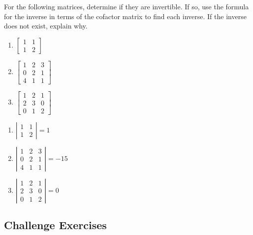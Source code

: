 \documentclass{ximera}
\begin{document}
\begin{problem}\label{prb:7.31} For the following matrices, determine if they are invertible. If so, use the formula for the inverse in terms of the cofactor matrix to
find each inverse. If the inverse does not exist, explain why.
\begin{enumerate}
\item
$\left[
\begin{array}{rr}
1 & 1 \\
1 & 2
\end{array}
\right]$
\item
$\left[
\begin{array}{rrr}
1 & 2 & 3 \\
0 & 2 & 1 \\
4 & 1 & 1
\end{array}
\right]$
\item
$\left[
\begin{array}{rrr}
1 & 2 & 1 \\
2 & 3 & 0 \\
0 & 1 & 2
\end{array}
\right] $
\end{enumerate}
\begin{hint}
\begin{enumerate}
\item $\left\vert
\begin{array}{cc}
1 & 1 \\
1 & 2
\end{array}
\right\vert = 1$
\item $\left\vert
\begin{array}{ccc}
1 & 2 & 3 \\
0 & 2 & 1 \\
4 & 1 & 1%
\end{array}
\right\vert = -15$
\item $\left\vert
\begin{array}{ccc}
1 & 2 & 1 \\
2 & 3 & 0 \\
0 & 1 & 2
\end{array}
\right\vert = 0$
\end{enumerate}
\end{hint}
\end{problem}

\subsection{Challenge Exercises}
\end{document}
